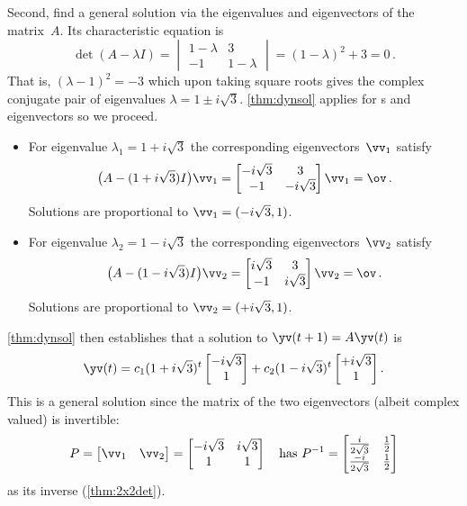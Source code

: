 \begin{example}
\begin{solution}
Second, find a general solution via the eigenvalues and eigenvectors of the matrix~\(A\).  
Its characteristic equation is 
\begin{equation*}
\det(A-\lambda I)=\begin{vmatrix} 1-\lambda&3\\-1&1-\lambda \end{vmatrix}
=(1-\lambda)^2+3=0\,.
\end{equation*}
That is, \((\lambda-1)^2=-3\) which upon taking square roots gives the complex conjugate pair of eigenvalues \(\lambda=1\pm i\sqrt3\).
\autoref{thm:dynsol} applies for s and eigenvectors so we proceed.
\begin{itemize}
\item For eigenvalue \(\lambda_1=1+i\sqrt3\) the corresponding eigenvectors~\(\vv_1\) satisfy
\begin{equation*}
\big(A-(1+i\sqrt3)I\big)\vv_1=\begin{bmatrix} -i\sqrt3&3\\-1&-i\sqrt3 \end{bmatrix}\vv_1=\ov\,.
\end{equation*}
Solutions are proportional to \(\vv_1=(-i\sqrt3,1)\).

\item For eigenvalue \(\lambda_2=1-i\sqrt3\) the corresponding eigenvectors~\(\vv_2\) satisfy
\begin{equation*}
\big(A-(1-i\sqrt3)I\big)\vv_2=\begin{bmatrix} i\sqrt3&3\\-1&i\sqrt3 \end{bmatrix}\vv_2=\ov\,.
\end{equation*}
Solutions are proportional to \(\vv_2=(+i\sqrt3,1)\).
\end{itemize}
\autoref{thm:dynsol} then establishes that a solution to \(\yv(t+1)=A\yv(t)\) is
\begin{equation*}
\yv(t)=c_1(1+i\sqrt3)^t\begin{bmatrix} -i\sqrt3\\1 \end{bmatrix}
+c_2(1-i\sqrt3)^t\begin{bmatrix} +i\sqrt3\\1 \end{bmatrix}.
\end{equation*}
This is a general solution since the matrix of the two eigenvectors (albeit complex valued) is invertible:
\begin{equation*}
P=\begin{bmatrix} \vv_1&\vv_2 \end{bmatrix}
=\begin{bmatrix} -i\sqrt3&i\sqrt3\\1&1 \end{bmatrix}
\quad\text{has }
P^{-1}=\begin{bmatrix} \frac i{2\sqrt3}&\frac12\\\frac{-i}{2\sqrt3}&\frac12 \end{bmatrix}
\end{equation*}
as its inverse (\autoref{thm:2x2det}).


\end{solution}
\end{example}
